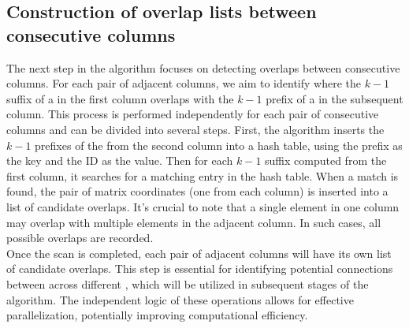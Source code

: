 \subsection{Construction of overlap lists between consecutive columns}
\label{sec:skmeroverlap}
The next step in the algorithm focuses on detecting overlaps between consecutive columns. For each pair of adjacent columns, we aim to identify where the $k-1$ suffix of a \kmer in the first column overlaps with the $k-1$ prefix of a \kmer in the subsequent column. This process is performed independently for each pair of consecutive columns and can be divided into several steps. First, the algorithm inserts the $k-1$ prefixes of the \kmers from the second column into a hash table, using the prefix as the key and the \skmer ID as the value. Then for each $k-1$ suffix computed from the first column, it searches for a matching entry in the hash table. When a match is found, the pair of matrix coordinates (one from each column) is inserted into a list of candidate overlaps. It's crucial to note that a single element in one column may overlap with multiple elements in the adjacent column. In such cases, all possible overlaps are recorded.\\
Once the scan is completed, each pair of adjacent columns will have its own list of candidate overlaps. This step is essential for identifying potential connections between \kmers across different \skmers, which will be utilized in subsequent stages of the algorithm. The independent logic of these operations allows for effective parallelization, potentially improving computational efficiency.

